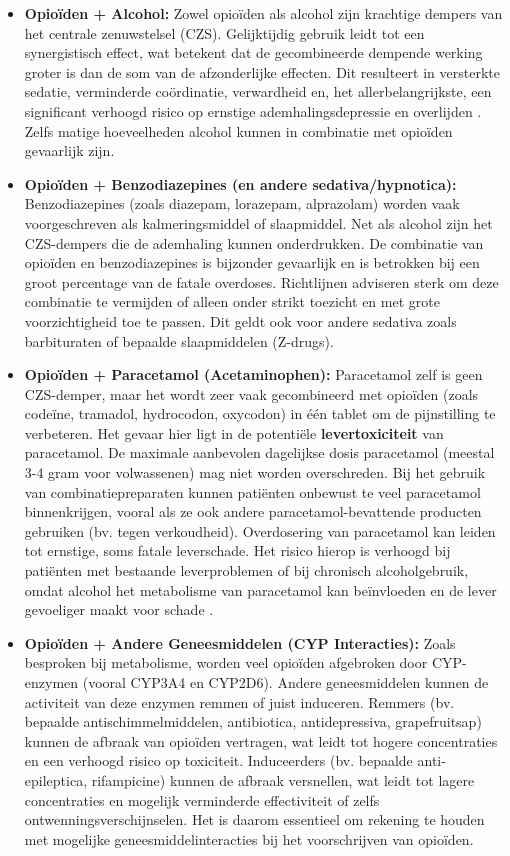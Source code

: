 \documentclass[11pt, a4paper]{report} %
\begin{document}
\begin{itemize}
    \item \textbf{Opioïden + Alcohol:} Zowel opioïden als alcohol zijn krachtige dempers van het centrale zenuwstelsel (CZS). Gelijktijdig gebruik leidt tot een synergistisch effect, wat betekent dat de gecombineerde dempende werking groter is dan de som van de afzonderlijke effecten. Dit resulteert in versterkte sedatie, verminderde coördinatie, verwardheid en, het allerbelangrijkste, een significant verhoogd risico op ernstige ademhalingsdepressie en overlijden \parencite{JACC2020CardioComplications, Gupta2010ChemistryOpioids}. Zelfs matige hoeveelheden alcohol kunnen in combinatie met opioïden gevaarlijk zijn.
    \item \textbf{Opioïden + Benzodiazepines (en andere sedativa/hypnotica):} Benzodiazepines (zoals diazepam, lorazepam, alprazolam) worden vaak voorgeschreven als kalmeringsmiddel of slaapmiddel. Net als alcohol zijn het CZS-dempers die de ademhaling kunnen onderdrukken. De combinatie van opioïden en benzodiazepines is bijzonder gevaarlijk en is betrokken bij een groot percentage van de fatale overdoses. Richtlijnen adviseren sterk om deze combinatie te vermijden of alleen onder strikt toezicht en met grote voorzichtigheid toe te passen. Dit geldt ook voor andere sedativa zoals barbituraten of bepaalde slaapmiddelen (Z-drugs).
    \item \textbf{Opioïden + Paracetamol (Acetaminophen):} Paracetamol zelf is geen CZS-demper, maar het wordt zeer vaak gecombineerd met opioïden (zoals codeïne, tramadol, hydrocodon, oxycodon) in één tablet om de pijnstilling te verbeteren. Het gevaar hier ligt in de potentiële \textbf{levertoxiciteit} van paracetamol. De maximale aanbevolen dagelijkse dosis paracetamol (meestal 3-4 gram voor volwassenen) mag niet worden overschreden. Bij het gebruik van combinatiepreparaten kunnen patiënten onbewust te veel paracetamol binnenkrijgen, vooral als ze ook andere paracetamol-bevattende producten gebruiken (bv. tegen verkoudheid). Overdosering van paracetamol kan leiden tot ernstige, soms fatale leverschade. Het risico hierop is verhoogd bij patiënten met bestaande leverproblemen of bij chronisch alcoholgebruik, omdat alcohol het metabolisme van paracetamol kan beïnvloeden en de lever gevoeliger maakt voor schade \parencite{MayoClinicOxyAcetaminophen, Gupta2010ChemistryOpioids}.
    \item \textbf{Opioïden + Andere Geneesmiddelen (CYP Interacties):} Zoals besproken bij metabolisme, worden veel opioïden afgebroken door CYP-enzymen (vooral CYP3A4 en CYP2D6). Andere geneesmiddelen kunnen de activiteit van deze enzymen remmen of juist induceren. Remmers (bv. bepaalde antischimmelmiddelen, antibiotica, antidepressiva, grapefruitsap) kunnen de afbraak van opioïden vertragen, wat leidt tot hogere concentraties en een verhoogd risico op toxiciteit. Induceerders (bv. bepaalde anti-epileptica, rifampicine) kunnen de afbraak versnellen, wat leidt tot lagere concentraties en mogelijk verminderde effectiviteit of zelfs ontwenningsverschijnselen. Het is daarom essentieel om rekening te houden met mogelijke geneesmiddelinteracties bij het voorschrijven van opioïden.
\end{itemize}
\end{document}
